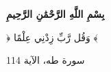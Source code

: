 \thispagestyle{empty}
\vspace*{\fill}
\begin{center}
\begin{Arabic}
{\Huge \textbf{بِسْمِ اللَّهِ الرَّحْمَٰنِ الرَّحِيمِ}}

\vspace{36pt}
{\Huge ﴿ وَقُل رَّبِّ زِدْنِي عِلْمًا ﴾}

\vspace{24pt}
{\large سورة طه، الآية 114}
\end{Arabic}
\end{center}
\vspace*{\fill}
\clearpage
